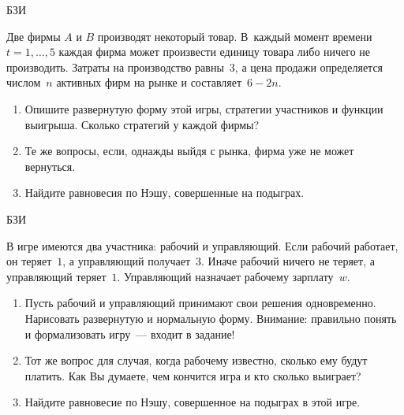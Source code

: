 \begin{problem}
\begin{source}
БЗИ
\end{source}
 Две фирмы $A$ и $B$ производят
некоторый товар. В~каждый момент времени $t=1,\ldots,5$
каждая фирма может произвести единицу товара либо ничего не
производить. Затраты на производство равны~$3$, а цена
продажи определяется числом~$n$ активных фирм на рынке и
составляет~$6-2n$.

\begin{enumerate}

\item Опишите развернутую форму этой игры, стратегии
участников и функции выигрыша. Сколько стратегий у каждой
фирмы?

\item Те же вопросы, если, однажды выйдя с рынка, фирма уже
не может вернуться.

\item Найдите равновесия по Нэшу, совершенные на подыграх.

\end{enumerate}






\begin{sol}

\end{sol}
\end{problem}



\begin{problem}
\begin{source}
БЗИ
\end{source}
 В игре имеются два
участника: рабочий и управляющий. Если рабочий работает, он
теряет~$1$, а управляющий получает~$3$. Иначе рабочий
ничего не теряет,  а управляющий теряет~$1$. Управляющий
назначает рабочему зарплату~$w$.

\begin{enumerate}

\item Пусть рабочий и управляющий принимают свои решения
одновременно. Нарисовать развернутую и нормальную форму.
Внимание: правильно понять и формализовать игру~--- входит
в задание!


\item Тот же вопрос для случая, когда рабочему известно,
сколько ему будут платить. Как Вы думаете, чем кончится
игра и кто сколько выиграет?

\item Найдите равновесие по Нэшу, совершенное на подыграх в этой игре.

\end{enumerate}






\begin{sol}

\end{sol}
\end{problem}






